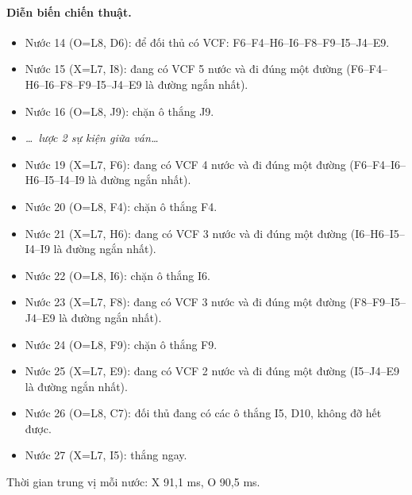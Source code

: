 \paragraph{Diễn biến chiến thuật.}
\begin{itemize}\small
\setlength{\itemsep}{0pt}
  \item Nước 14 (O=L8, D6): để đối thủ có VCF: F6--F4--H6--I6--F8--F9--I5--J4--E9.
  \item Nước 15 (X=L7, I8): đang có VCF 5 nước và đi đúng một đường (F6--F4--H6--I6--F8--F9--I5--J4--E9 là đường ngắn nhất).
  \item Nước 16 (O=L8, J9): chặn ô thắng J9.
  \item[] \emph{\dots\ lược 2 sự kiện giữa ván\dots}
  \item Nước 19 (X=L7, F6): đang có VCF 4 nước và đi đúng một đường (F6--F4--I6--H6--I5--I4--I9 là đường ngắn nhất).
  \item Nước 20 (O=L8, F4): chặn ô thắng F4.
  \item Nước 21 (X=L7, H6): đang có VCF 3 nước và đi đúng một đường (I6--H6--I5--I4--I9 là đường ngắn nhất).
  \item Nước 22 (O=L8, I6): chặn ô thắng I6.
  \item Nước 23 (X=L7, F8): đang có VCF 3 nước và đi đúng một đường (F8--F9--I5--J4--E9 là đường ngắn nhất).
  \item Nước 24 (O=L8, F9): chặn ô thắng F9.
  \item Nước 25 (X=L7, E9): đang có VCF 2 nước và đi đúng một đường (I5--J4--E9 là đường ngắn nhất).
  \item Nước 26 (O=L8, C7): đối thủ đang có các ô thắng I5, D10, không đỡ hết được.
  \item Nước 27 (X=L7, I5): thắng ngay.
\end{itemize}
Thời gian trung vị mỗi nước: X 91,1 ms, O 90,5 ms.
\clearpage
